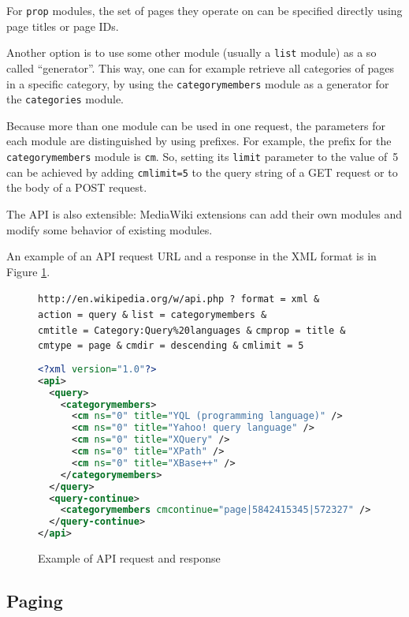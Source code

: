 For \texttt{prop} modules, the set of pages they operate on can be specified directly using page titles or page IDs.

Another option is to use some other module (usually a \texttt{list} module) as a so called “generator”.
This way, one can for example retrieve all categories of pages in a specific category,
by using the \texttt{categorymembers} module as a generator for the \texttt{categories} module.

Because more than one module can be used in one request,
the parameters for each module are distinguished by using prefixes.
For example, the prefix for the \texttt{categorymembers} module is \texttt{cm}.
So, setting its \texttt{limit} parameter to the value of~5 can be achieved by
adding \texttt{cmlimit=5} to the query string of a GET request or to the body of a POST request.

The \ac{API} is also extensible: MediaWiki extensions can add their own modules and modify some behavior of existing modules.

An example of an \ac{API} request \ac{URL} and a response in the \ac{XML} format is in Figure \ref{API example}.

\begin{figure}[htbp]
\texttt{http://en.wikipedia.org/w/api.php}~\texttt{?}\
\texttt{format}~\texttt{=}~\texttt{xml}~\texttt{\&}
\texttt{action}~\texttt{=}~\texttt{query}~\texttt{\&}
\texttt{list}~\texttt{=}~\texttt{categorymembers}~\texttt{\&}
\texttt{cmtitle}~\texttt{=}~\texttt{Category:Query\%20languages}~\texttt{\&}
\texttt{cmprop}~\texttt{=}~\texttt{title}~\texttt{\&}
\texttt{cmtype}~\texttt{=}~\texttt{page}~\texttt{\&}
\texttt{cmdir}~\texttt{=}~\texttt{descending}~\texttt{\&}
\texttt{cmlimit}~\texttt{=}~\texttt{5}

\begin{lstlisting}[language=xml]
<?xml version="1.0"?>
<api>
  <query>
    <categorymembers>
      <cm ns="0" title="YQL (programming language)" />
      <cm ns="0" title="Yahoo! query language" />
      <cm ns="0" title="XQuery" />
      <cm ns="0" title="XPath" />
      <cm ns="0" title="XBase++" />
    </categorymembers>
  </query>
  <query-continue>
    <categorymembers cmcontinue="page|5842415345|572327" />
  </query-continue>
</api>
\end{lstlisting}

\caption{Example of \ac{API} request and response}
\label{API example}
\end{figure}

\subsection{Paging}
\label{mw paging}


